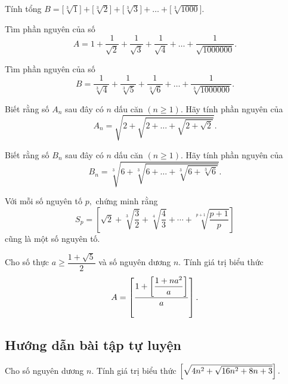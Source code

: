 \begin{btt}
Tính tổng
$B=\bigg[\sqrt[3]{1}\bigg]+\bigg[\sqrt[3]{2}\bigg]+\bigg[\sqrt[3]{3}\bigg]+\ldots+\bigg[\sqrt[3]{1000}\bigg].$
\end{btt}

\begin{btt}
Tìm phần nguyên của số $$A=1+\dfrac{1}{\sqrt{2}}+\dfrac{1}{\sqrt{3}}+\dfrac{1}{\sqrt{4}}+\ldots+\dfrac{1}{\sqrt{1000000}}.$$
\end{btt}

\begin{btt}
Tìm phần nguyên của số  $$B=\dfrac{1}{\sqrt[3]{4}}+\dfrac{1}{\sqrt[3]{5}}+\dfrac{1}{\sqrt[3]{6}}+\ldots+\dfrac{1}{\sqrt[3]{1000000}}.$$
\end{btt}

\begin{btt}
Biết rằng số $A_n$ sau đây có $n$ dấu căn $(n\ge 1)$. Hãy tính phần nguyên của
\[A_n=\sqrt{2+\sqrt{2+\ldots+\sqrt{2+\sqrt{2}}}}.\]
\end{btt}

\begin{btt}
Biết rằng số $B_n$ sau đây có $n$ dấu căn $(n\ge 1)$. Hãy tính phần nguyên của
\[B_n=\sqrt[3]{6+\sqrt[3]{6+\ldots+\sqrt[3]{6+\sqrt[3]{6}}}}.\]
\end{btt}

\begin{btt}
Với mỗi số nguyên tố $p,$ chứng minh rằng $$S_p=\left[\sqrt{2}+\sqrt[3]{\dfrac{3}{2}}+\sqrt[4]{\dfrac{4}{3}}+\cdots+\sqrt[p+1]{\dfrac{p+1}{p}}\right]$$ 
cũng là một số nguyên tố.
\end{btt}

\begin{btt}
Cho số thực $a\ge\dfrac{1+\sqrt{5}}{2}$ và số nguyên dương $n.$ Tính giá trị biểu thức \[A=\left[ \dfrac{1+\left[ \dfrac{1+n{a^2}}{a} \right]}{a} \right].\]
\end{btt}

\subsection*{Hướng dẫn bài tập tự luyện}

\begin{gbtt}
Cho số nguyên dương $n.$ Tính giá trị biểu thức $\left[ \sqrt{4 n^{2}+\sqrt{16 n^{2}+8 n+3}} \right].$
\end{gbtt}

